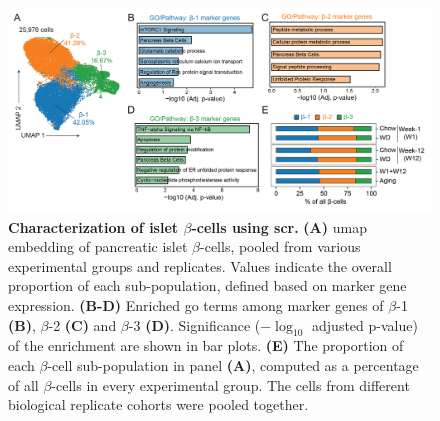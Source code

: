 \begin{figure}[t!]
    \centering
    \includegraphics[width=\linewidth]{Chapter4/Fig/F2-12-02.png}
    \caption[Characterization of islet $\beta$-cells using ]{\textbf{Characterization of islet $\beta$-cells using \gls{scr}.} \textbf{(A)} \gls{umap} embedding of pancreatic islet $\beta$-cells, pooled from various experimental groups and replicates. Values indicate the overall proportion of each sub-population, defined based on marker gene expression. \textbf{(B-D)} Enriched \gls{go} terms among marker genes of $\beta$-1 \textbf{(B)}, $\beta$-2 \textbf{(C)} and $\beta$-3 \textbf{(D)}. Significance ($-\log_{10}$ adjusted p-value) of the enrichment are shown in bar plots. \textbf{(E)} The proportion of each $\beta$-cell sub-population in panel \textbf{(A)}, computed as a percentage of all $\beta$-cells in every experimental group. The cells from different biological replicate cohorts were pooled together.}
    \label{fig:chp2_scrna_betacells1}
\end{figure}
